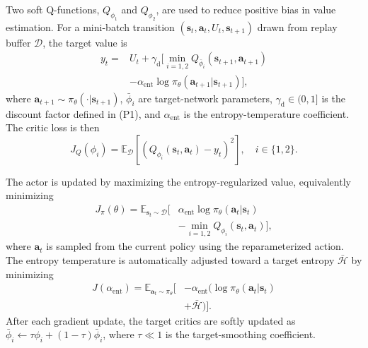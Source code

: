 \documentclass[journal]{IEEEtran}
\begin{document}
Two soft Q-functions, $Q_{\phi_1}$ and $Q_{\phi_2}$, are used to reduce positive bias in value estimation. For a mini-batch transition $(\mathbf{s}_t,\mathbf{a}_t,U_t,\mathbf{s}_{t+1})$ drawn from replay buffer $\mathcal{D}$, the target value is
\begin{equation}
\begin{aligned}
y_t={}&U_t+\gamma_{\text{d}}\Big[
\min_{i=1,2}Q_{\bar{\phi}_i}(\mathbf{s}_{t+1},\mathbf{a}_{t+1})\\
&-\alpha_{\text{ent}}\log\pi_\theta(\mathbf{a}_{t+1}|\mathbf{s}_{t+1})\Big],
\end{aligned}
\label{eq:sac_target}
\end{equation}
where $\mathbf{a}_{t+1}\sim\pi_\theta(\cdot|\mathbf{s}_{t+1})$, $\bar{\phi}_i$ are target-network parameters, $\gamma_{\text{d}}\in(0,1]$ is the discount factor defined in (P1), and $\alpha_{\text{ent}}$ is the entropy-temperature coefficient. The critic loss is then
\begin{equation}
J_Q(\phi_i)=\mathbb{E}_{\mathcal{D}}\left[\left(Q_{\phi_i}(\mathbf{s}_t,\mathbf{a}_t)-y_t\right)^2\right],\quad i\in\{1,2\}.
\label{eq:sac_critic_loss}
\end{equation}

The actor is updated by maximizing the entropy-regularized value, equivalently minimizing
\begin{equation}
\begin{aligned}
J_{\pi}(\theta)=\mathbb{E}_{\mathbf{s}_t\sim\mathcal{D}}\Big[
&\alpha_{\text{ent}}\log\pi_\theta(\mathbf{a}_t|\mathbf{s}_t)\\
&-\min_{i=1,2}Q_{\phi_i}(\mathbf{s}_t,\mathbf{a}_t)
\Big],
\end{aligned}
\label{eq:sac_actor_loss}
\end{equation}
where $\mathbf{a}_t$ is sampled from the current policy using the reparameterized action. The entropy temperature is automatically adjusted toward a target entropy $\bar{\mathcal{H}}$ by minimizing
\begin{equation}
\begin{aligned}
J(\alpha_{\text{ent}})=
\mathbb{E}_{\mathbf{a}_t\sim\pi_\theta}\Big[
&-\alpha_{\text{ent}}\big(\log\pi_\theta(\mathbf{a}_t|\mathbf{s}_t)\\
&+\bar{\mathcal{H}}\big)\Big].
\end{aligned}
\label{eq:sac_temp_loss}
\end{equation}
After each gradient update, the target critics are softly updated as $\bar{\phi}_i\leftarrow \tau\phi_i+(1-\tau)\bar{\phi}_i$, where $\tau\ll1$ is the target-smoothing coefficient.
\end{document}
